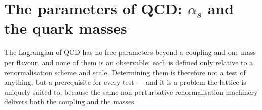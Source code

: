 \chapter{The parameters of QCD: $\alpha_s$ and the quark masses}
\label{ch:strong-coupling-sf}

The Lagrangian of QCD has no free parameters beyond a coupling and one mass per
flavour, and none of them is an observable: each is defined only relative to a
renormalisation scheme and scale. Determining them is therefore not a test of
anything, but a prerequisite for every test --- and it is a problem the lattice
is uniquely suited to, because the same non-perturbative renormalisation
machinery delivers both the coupling and the masses.




